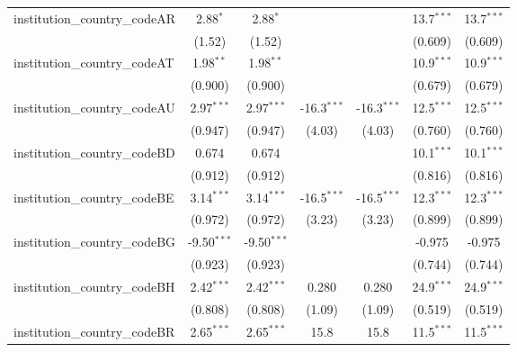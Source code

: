 \begin{tabular}{lcccccc}
   institution\_country\_codeAR          & 2.88$^{*}$     & 2.88$^{*}$     &               &               & 13.7$^{***}$  & 13.7$^{***}$\\   
                                         & (1.52)         & (1.52)         &               &               & (0.609)       & (0.609)\\   
   institution\_country\_codeAT          & 1.98$^{**}$    & 1.98$^{**}$    &               &               & 10.9$^{***}$  & 10.9$^{***}$\\   
                                         & (0.900)        & (0.900)        &               &               & (0.679)       & (0.679)\\   
   institution\_country\_codeAU          & 2.97$^{***}$   & 2.97$^{***}$   & -16.3$^{***}$ & -16.3$^{***}$ & 12.5$^{***}$  & 12.5$^{***}$\\   
                                         & (0.947)        & (0.947)        & (4.03)        & (4.03)        & (0.760)       & (0.760)\\   
   institution\_country\_codeBD          & 0.674          & 0.674          &               &               & 10.1$^{***}$  & 10.1$^{***}$\\   
                                         & (0.912)        & (0.912)        &               &               & (0.816)       & (0.816)\\   
   institution\_country\_codeBE          & 3.14$^{***}$   & 3.14$^{***}$   & -16.5$^{***}$ & -16.5$^{***}$ & 12.3$^{***}$  & 12.3$^{***}$\\   
                                         & (0.972)        & (0.972)        & (3.23)        & (3.23)        & (0.899)       & (0.899)\\   
   institution\_country\_codeBG          & -9.50$^{***}$  & -9.50$^{***}$  &               &               & -0.975        & -0.975\\   
                                         & (0.923)        & (0.923)        &               &               & (0.744)       & (0.744)\\   
   institution\_country\_codeBH          & 2.42$^{***}$   & 2.42$^{***}$   & 0.280         & 0.280         & 24.9$^{***}$  & 24.9$^{***}$\\   
                                         & (0.808)        & (0.808)        & (1.09)        & (1.09)        & (0.519)       & (0.519)\\   
   institution\_country\_codeBR          & 2.65$^{***}$   & 2.65$^{***}$   & 15.8          & 15.8          & 11.5$^{***}$  & 11.5$^{***}$\\   

\end{tabular}
